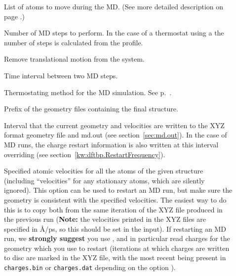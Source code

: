 \begin{description}
\item[] List of atoms to move during the MD. (See more
  detailed description on page .)

\item[] Number of MD steps to perform. In the case of a
  thermostat using a  the number of steps is
  calculated from the profile.

\item[] Remove translational motion from the system.


\item[] Time interval between two
  MD steps.

\item[] Thermostating method for the MD simulation. See
  p.~.

\item[] Prefix of the geometry files containing the
  final structure.

\item[] Interval that the current geometry and
  velocities are written to the XYZ format geometry file and md.out
  (see section~\ref{sec:md.out}). In the case of  MD runs, the
  charge restart information is also written at this interval
  overriding  (see
  section~\ref{kw:dftbp.RestartFrequency}).

\item[] Specified atomic velocities for
  all the atoms of the given structure (including ``velocities'' for any
  stationary atoms, which are silently ignored). This option can be used to
  restart an MD run, but make sure the geometry is consistent with the specified
  velocities. The easiest way to do this is to copy both from the same iteration
  of the XYZ file produced in the previous run (\textbf{Note:} the velocities
  printed in the XYZ files are specified in {\AA}/ps, so this should be set in
  the input). If restarting an  MD run, we \textbf{strongly suggest} you
  use , and in particular read charges for the geometry
  which you use to restart (iterations at which charges are written to disc are
  marked in the XYZ file, with the most recent being present in
  \verb|charges.bin| or \verb|charges.dat| depending on the option
  ).


\end{description}
